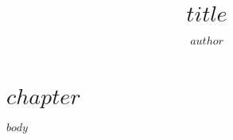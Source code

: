 \documentclass[12pt]{bwpracticum}
\title{$title$}
\author{$author$}
\begin{document}
\chapter{$chapter$}

$body$
\end{document}
